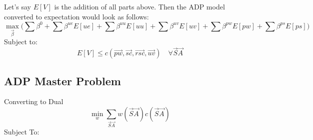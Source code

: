 \documentclass{article}
\begin{document}
Let's say $E[V]$ is the addition of all parts above. Then the ADP model converted to expectation would look as follows:
\begin{equation}
	\max_{\vec{\beta}} \Big( \sum \beta^{0} + \sum \beta^{ue} E[ue] + \sum \beta^{uu} E[uu] + \sum \beta^{uv} E[uv] 
		+ \sum \beta^{pw} E[pw] + \sum \beta^{ps} E[ps] \Big)
\end{equation}
Subject to:
\begin{equation}
	E[V] \le c(\vec{pw}, \vec{sc}, \vec{rsc}, \vec{uv}) \quad \forall \vec{S} \vec{A} 
\end{equation}


\subsection{ADP Master Problem}
\label{Dual of ADP LP}
Converting to Dual
\begin{equation}
	\min_{w} \sum_{\vec{S} \vec{A}} w(\vec{S} \vec{A}) c(\vec{S} \vec{A})
\end{equation}
Subject To:
\end{document}
